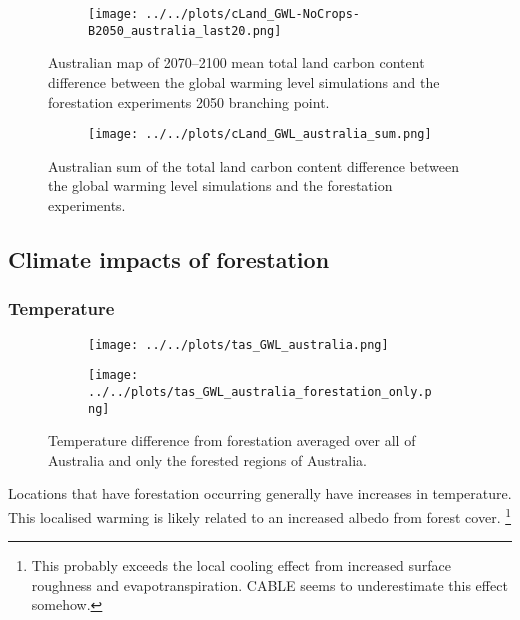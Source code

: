 \documentclass[]{article}
\begin{document}
\begin{figure}[H]
    \centering
    \begin{subfigure}[b]{\linewidth}
        \texttt{[image: ../../plots/cLand\_GWL-NoCrops-B2050\_australia\_last20.png]}
    \end{subfigure}
    \caption{Australian map of 2070--2100 mean total land carbon content difference between the global warming level simulations and the forestation experiments 2050 branching point.}
    \label{fig:aus_map_cLand}
\end{figure}

\begin{figure}[H]
    \centering
    \begin{subfigure}[b]{\linewidth}
        \texttt{[image: ../../plots/cLand\_GWL\_australia\_sum.png]}
    \end{subfigure}
    \caption{Australian sum of the total land carbon content difference between the global warming level simulations and the forestation experiments.}
    \label{fig:australia_cLand}
\end{figure}

\subsection{Climate impacts of forestation}

\subsubsection{Temperature}

\begin{figure}[H]
    \centering
    \begin{subfigure}[b]{0.4\linewidth}
        \texttt{[image: ../../plots/tas\_GWL\_australia.png]}
    \end{subfigure}
    \begin{subfigure}[b]{0.4\linewidth}
        \texttt{[image: ../../plots/tas\_GWL\_australia\_forestation\_only.png]}
    \end{subfigure}
    \caption{Temperature difference from forestation averaged over all of Australia and only the forested regions of Australia.}
    \label{fig:tas_australia_timeseries}
\end{figure}

Locations that have forestation occurring generally have increases in temperature.
This localised warming is likely related to an increased albedo from forest cover.
\footnote{This probably exceeds the local cooling effect from increased surface roughness and evapotranspiration. CABLE seems to underestimate this effect somehow.}
\end{document}
